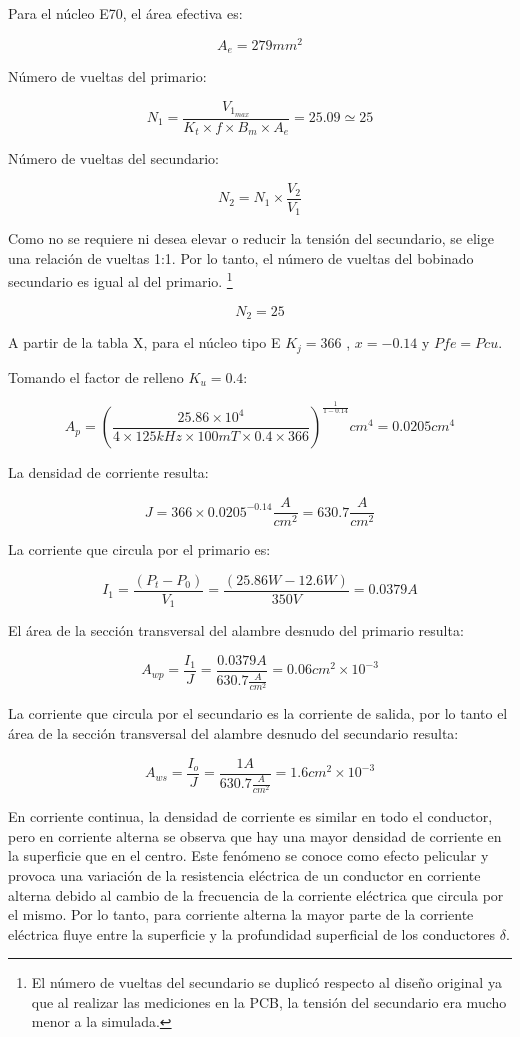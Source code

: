 Para el núcleo E70, el área efectiva es: 

$$ A_{e}=279{mm}^{2} $$

Número de vueltas del primario:

$$ N_{1}=\frac{V_{1_{max}}}{K_{t}\times f\times B_{m}\times A_{e}}=25.09\simeq 25 $$

Número de vueltas del secundario: 

$$ N_{2}=N_{1}\times\frac{V_{2}}{V_{1}} $$

Como no se requiere ni desea elevar o reducir la tensión del secundario, se elige una relación de vueltas 1:1. 
Por lo tanto, el número de vueltas del bobinado secundario es igual al del primario. \footnote{El número de vueltas del secundario se duplicó respecto al diseño original ya que al realizar las mediciones en la PCB, la tensión del secundario era mucho menor a la simulada.}

$$ N_{2}=25 $$

A partir de la tabla X, para el núcleo tipo E $ K_{j}=366$ , $x=-0.14$ y $Pfe=Pcu$. 

Tomando el factor de relleno $K_u=0.4$:

$$ A_{p}=\left(\frac{25.86\times 10^{4}}{4\times 125kHz\times 100mT\times 0.4\times 366}\right)^{\frac{1}{1-0.14}} {cm}^4=0.0205 {cm}^4$$

La densidad de corriente resulta:

$$ J=366\times 0.0205^{-0.14} \frac{A}{cm^2}=630.7 \frac{A}{cm^2} $$

La corriente que circula por el primario es:

$$ I_1=\frac{(P_t-P_0)}{V_1}=\frac{(25.86W-12.6W)}{350V}=0.0379A $$

El área de la sección transversal del alambre desnudo del primario resulta:

$$ A_{wp}=\frac{I_1}{J}=\frac{0.0379A}{630.7 \frac{A}{cm^2}}=0.06cm^2 \times10^{-3} $$

La corriente que circula por el secundario es la corriente de salida, 
por lo tanto el área de la sección transversal del alambre desnudo del secundario resulta:

$$ A_{ws}=\frac{I_o}{J}=\frac{1A}{630.7 \frac{A}{cm^2}}=1.6cm^2\times10^{-3} $$


En corriente continua, la densidad de corriente es similar en todo el conductor, pero en corriente alterna se observa que hay una mayor densidad de corriente en la superficie que en el centro. 
Este fenómeno se conoce como efecto pelicular y provoca una variación de la resistencia eléctrica de un conductor en corriente alterna debido al cambio de la frecuencia de la corriente eléctrica que circula por el mismo.
Por lo tanto, para corriente alterna la mayor parte de la corriente eléctrica fluye entre la superficie y la profundidad superficial de los conductores $δ$.

